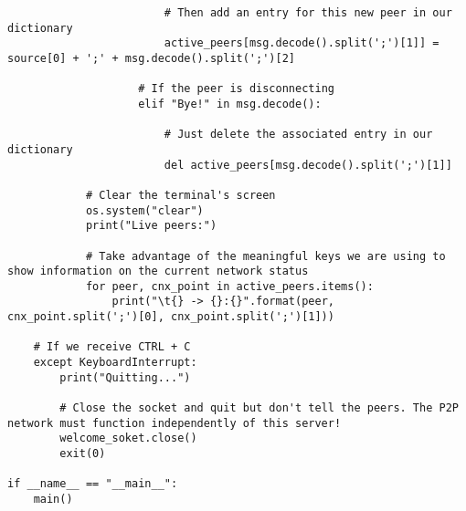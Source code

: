 \documentclass[landscape]{article}
\begin{document}
\begin{verbatim}
                        # Then add an entry for this new peer in our dictionary
                        active_peers[msg.decode().split(';')[1]] = source[0] + ';' + msg.decode().split(';')[2]

                    # If the peer is disconnecting
                    elif "Bye!" in msg.decode():

                        # Just delete the associated entry in our dictionary
                        del active_peers[msg.decode().split(';')[1]]

            # Clear the terminal's screen
            os.system("clear")
            print("Live peers:")

            # Take advantage of the meaningful keys we are using to show information on the current network status
            for peer, cnx_point in active_peers.items():
                print("\t{} -> {}:{}".format(peer, cnx_point.split(';')[0], cnx_point.split(';')[1]))

    # If we receive CTRL + C
    except KeyboardInterrupt:
        print("Quitting...")

        # Close the socket and quit but don't tell the peers. The P2P network must function independently of this server!
        welcome_soket.close()
        exit(0)

if __name__ == "__main__":
    main()
            \end{verbatim}
\end{document}
